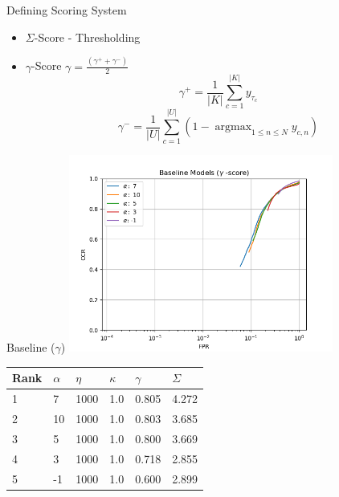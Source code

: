 \begin{frame}{Defining Scoring System}
	\begin{itemize}
		\item $\Sigma$-Score - Thresholding
		\item $\gamma$-Score $ \gamma = \frac{(\gamma^+ + \gamma^-)}{2}$
		      \begin{equation}
			      \gamma^+ = \frac{1}{|K|} \sum_{c=1}^{|K|} y_{\tau_c}
		      \end{equation}
		      \begin{equation}
			      \gamma^- = \frac{1}{|U|} \sum_{c=1}^{|U|} \left ( 1 - \operatorname{argmax}_{1 \leq n \leq N} y_{c,n} \right)
		      \end{equation}
	\end{itemize}
\end{frame}

\begin{frame}{Baseline ($\gamma$)}
	\centering
	\includegraphics[width=0.65\textwidth]{figures/base_gamma.png}
	\footnotesize{	\begin{tabularx}{\textwidth}{ |X|X|X|X|X|X| }
			\hline
			Rank & $\alpha$ & $\eta$ & $\kappa$ & $\gamma$ & $\Sigma$ \\
			\hline
			1    & 7        & 1000   & 1.0      & 0.805    & 4.272    \\
			2    & 10       & 1000   & 1.0      & 0.803    & 3.685    \\
			3    & 5        & 1000   & 1.0      & 0.800    & 3.669    \\
			4    & 3        & 1000   & 1.0      & 0.718    & 2.855    \\
			5    & -1       & 1000   & 1.0      & 0.600    & 2.899    \\
			\hline
		\end{tabularx}}
\end{frame}

